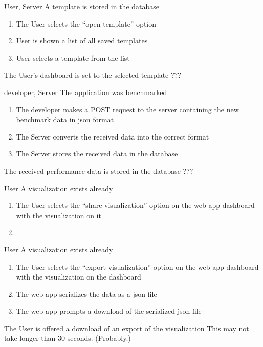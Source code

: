 \bigskip

{User, Server}
{A \gls{template} is stored in the database}
{\begin{enumerate}
    \item The User selects the \enquote{open template} option
    \item User is shown a list of all saved \glspl{template}
    \item User selects a \gls{template} from the list
\end{enumerate}} 
{The User's dashboard is set to the selected template}
{???}

\bigskip

{\Gls{developer}, Server}
{The application was benchmarked}
{\begin{enumerate}
    \item The \gls{developer} makes a POST request to the server containing the new benchmark data in \acrshort{json} format
    \item The Server converts the received data into the correct format
    \item The Server stores the received data in the database
\end{enumerate}} 
{The received performance data is stored in the database}
{???}

\bigskip

{User}
{A \gls{visualization} exists already}
{\begin{enumerate}
    \item The User selects the \enquote{share visualization} option on the web app dashboard with the \gls{visualization} on it
    \item 
\end{enumerate}} 
{}
{}

\bigskip

{User}
{A \gls{visualization} exists already}
{\begin{enumerate}
    \item The User selects the \enquote{export visualization} option on the web app dashboard with the \gls{visualization} on the dashboard
    \item The web app serializes the data as a \acrshort{json} file
    \item The web app prompts a download of the serialized \acrshort{json} file
\end{enumerate}} 
{The User is offered a download of an export of the visualization}
{This may not take longer than 30 seconds. (Probably.)}

